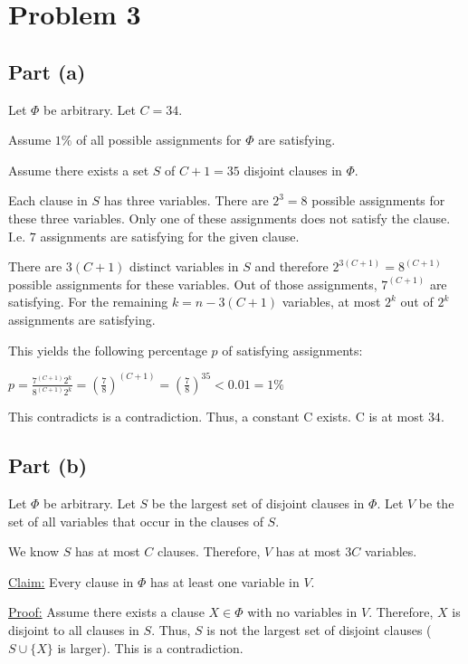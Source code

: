 \section*{Problem 3}

\subsection*{Part (a)}

Let $\Phi$ be arbitrary. Let $C = 34$.

Assume $1\%$ of all possible assignments  for $\Phi$ are satisfying. 

Assume there exists a set $S$ of $C + 1 = 35$ disjoint clauses in $\Phi$.

Each clause in $S$ has three variables. There are $2^3 = 8$ possible assignments for these three variables. Only one of these assignments does not satisfy the clause. I.e. $7$ assignments are satisfying for the given clause.

There are $3(C + 1)$ distinct variables in $S$ and therefore $2^{3(C+1)} = 8^{(C+1)}$ possible assignments for these variables. Out of those assignments, $7^{(C + 1)}$ are satisfying. For the remaining $k = n - 3(C + 1)$ variables, at most $2^k$ out of $2^k$ assignments are satisfying. 

This yields the following percentage $p$ of satisfying assignments:

$p = \frac{7^{(C + 1)} 2^k}{8^{(C + 1)}2^k} = \left(\frac{7}{8}\right)^{(C+1)} = \left(\frac{7}{8}\right)^{35} < 0.01 = 1\%$

This contradicts is a contradiction. Thus, a constant C exists. C is at most $34$.

\subsection*{Part (b)}

Let $\Phi$ be arbitrary. Let $S$ be the largest set of disjoint clauses in $\Phi$. Let $V$ be the set of all variables that occur in the clauses of $S$.

We know $S$ has at most $C$ clauses. Therefore, $V$ has at most $3C$ variables. 

\underline{Claim:} Every clause in $\Phi$ has at least one variable in $V$.

\underline{Proof:} Assume there exists a clause $X \in \Phi$ with no variables in $V$. Therefore, $X$ is disjoint to all clauses in $S$. Thus, $S$ is not the largest set of disjoint clauses ($S \cup \{X\}$ is larger). This is a contradiction.

